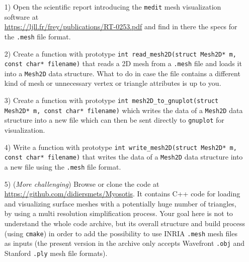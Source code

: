 \documentclass[a3paper,12pt]{article}
\begin{document}
\begin{itemize}
\item[1)]  Open the scientific report introducing the {\tt medit} mesh visualization software at\\ 
\url{https://ljll.fr/frey/publications/RT-0253.pdf} and find in there the specs for the {\tt .mesh} file format.\\[-5pt]

\item[2)] Create a function with prototype \texttt{int read\_mesh2D(struct Mesh2D* m, const char* filename)}
  that reads a 2D mesh from a {\tt .mesh} file and loads it into a {\tt Mesh2D} data structure. What to do in case the file contains a different kind of mesh or unnecessary vertex or triangle attributes is up to you.\\[-5pt]

\item[3)] Create a function with prototype \texttt{int mesh2D\_to\_gnuplot(struct Mesh2D* m, const char* filename)} which writes the data of a {\tt Mesh2D} data structure into a new file which can then be sent directly to {\tt gnuplot} for visualization.\\[-5pt]
  
\item[4)] Write a function with prototype \texttt{int write\_mesh2D(struct Mesh2D* m, const char* filename)} that writes the data of a {\tt Mesh2D} data structure into a new file using the {\tt .mesh} file format.   

\item[5)] ({\it More challenging}) Browse or clone the code at
\url{https://github.com/didiersmets/Myosotis}. It contains C++ code for loading and visualizing surface meshes with a potentially huge number of triangles, by using a multi resolution simplification process. Your goal here is not to understand the whole code archive, but its overall structure and build process (using {\tt cmake}) in order to add the possibility to use INRIA {\tt .mesh} mesh files as inputs (the present version in the archive only accepts Wavefront {\tt .obj} and Stanford {\tt .ply} mesh file formats).  

\end{itemize}
\end{document}
